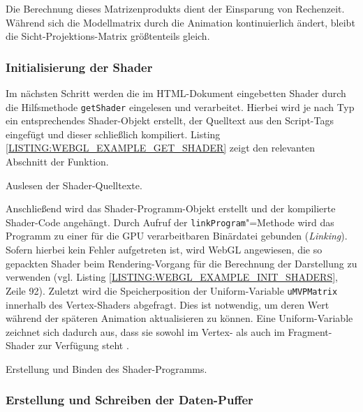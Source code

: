 Die Berechnung dieses Matrizenprodukts dient der Einsparung von Rechenzeit. Während sich die Modellmatrix durch die Animation kontinuierlich ändert, bleibt die Sicht-Projektions-Matrix größtenteils gleich.

\subsubsection{Initialisierung der Shader}

Im nächsten Schritt werden die im HTML-Dokument eingebetten Shader durch die Hilfsmethode \texttt{getShader} eingelesen und verarbeitet. Hierbei wird je nach Typ ein entsprechendes Shader-Objekt erstellt, der Quelltext aus den Script-Tags eingefügt und dieser schließlich kompiliert. Listing \ref{LISTING:WEBGL_EXAMPLE_GET_SHADER} zeigt den relevanten Abschnitt der Funktion.

\smallskip
\begin{listing}[!htb]
\caption{Auslesen der Shader-Quelltexte.}
\label{LISTING:WEBGL_EXAMPLE_GET_SHADER}
\end{listing}

Anschließend wird das Shader-Programm-Objekt erstellt und der kompilierte Shader-Code angehängt. Durch Aufruf der \texttt{linkProgram}"=Methode wird das Programm zu einer für die GPU verarbeitbaren Binärdatei gebunden (\emph{Linking}). Sofern hierbei kein Fehler aufgetreten ist, wird WebGL angewiesen, die so gepackten Shader beim Rendering-Vorgang für die Berechnung der Darstellung zu verwenden (vgl. Listing \ref{LISTING:WEBGL_EXAMPLE_INIT_SHADERS}, Zeile 92). Zuletzt wird die Speicherposition der Uniform-Variable \texttt{uMVPMatrix} innerhalb des Vertex-Shaders abgefragt. Dies ist notwendig, um deren Wert während der späteren Animation aktualisieren zu können. Eine Uniform-Variable zeichnet sich dadurch aus, dass sie sowohl im Vertex- als auch im Fragment-Shader zur Verfügung steht \autocite{Matsuda:2013}.

\smallskip
\begin{listing}[!htb]
\caption{Erstellung und Binden des Shader-Programms.}
\label{LISTING:WEBGL_EXAMPLE_INIT_SHADERS}
\end{listing}

\subsubsection{Erstellung und Schreiben der Daten-Puffer}

